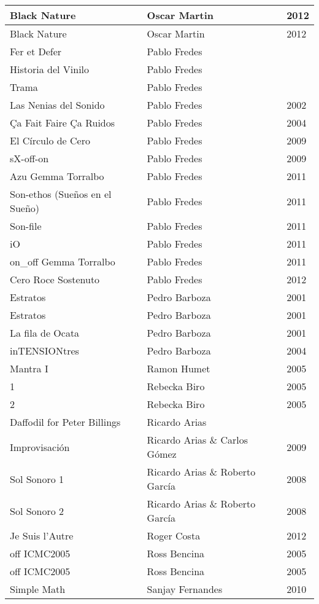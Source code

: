\begin{center}
\begin{longtable}{| p{} | p{} | p{} |}
Black Nature & Oscar Martin & 2012 \\ \hline 
Black Nature & Oscar Martin & 2012 \\ \hline 
Fer et Defer & Pablo Fredes &  \\ \hline 
Historia del Vinilo & Pablo Fredes &  \\ \hline 
Trama & Pablo Fredes &  \\ \hline 
Las Nenias del Sonido & Pablo Fredes & 2002 \\ \hline 
Ça Fait Faire Ça Ruidos & Pablo Fredes & 2004 \\ \hline 
El Círculo de Cero & Pablo Fredes & 2009 \\ \hline 
sX-off-on & Pablo Fredes & 2009 \\ \hline 
Azu Gemma Torralbo & Pablo Fredes & 2011 \\ \hline 
Son-ethos (Sueños en el Sueño) & Pablo Fredes & 2011 \\ \hline 
Son-file & Pablo Fredes & 2011 \\ \hline 
iO & Pablo Fredes & 2011 \\ \hline 
on\_off Gemma Torralbo & Pablo Fredes & 2011 \\ \hline 
Cero Roce Sostenuto & Pablo Fredes & 2012 \\ \hline 
Estratos & Pedro Barboza & 2001 \\ \hline 
Estratos & Pedro Barboza & 2001 \\ \hline 
La fila de Ocata & Pedro Barboza & 2001 \\ \hline 
inTENSIONtres & Pedro Barboza & 2004 \\ \hline 
Mantra I & Ramon Humet & 2005 \\ \hline 
1 & Rebecka Biro & 2005 \\ \hline 
2 & Rebecka Biro & 2005 \\ \hline 
Daffodil for Peter Billings & Ricardo Arias &  \\ \hline 
Improvisación & Ricardo Arias \& Carlos Gómez & 2009 \\ \hline 
Sol Sonoro 1 & Ricardo Arias \& Roberto García & 2008 \\ \hline 
Sol Sonoro 2 & Ricardo Arias \& Roberto García & 2008 \\ \hline 
Je Suis l'Autre & Roger Costa & 2012 \\ \hline 
off ICMC2005 & Ross Bencina & 2005 \\ \hline 
off ICMC2005 & Ross Bencina & 2005 \\ \hline 
Simple Math & Sanjay Fernandes & 2010 \\ \hline 

\end{longtable}
\end{center}

